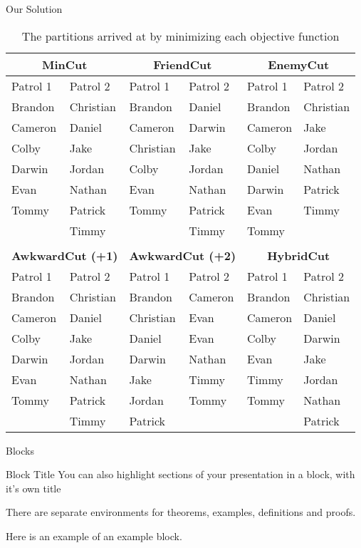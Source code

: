\documentclass{beamer}
\begin{document}
\begin{frame}{Our Solution}

\begin{table}[h]
\centering
\footnotesize
\begin{tabular}{ |l|l|l|l|l|l| }
\hline
\multicolumn{2}{|c|}{\textbf{MinCut}} & \multicolumn{2}{|c|}{\textbf{FriendCut}} & \multicolumn{2}{|c|}{\textbf{EnemyCut}}\\
\hline
Patrol 1 & Patrol 2 & Patrol 1 & Patrol 2 & Patrol 1 & Patrol 2\\
\hline
Brandon & Christian & Brandon & Daniel & Brandon & Christian\\
Cameron & Daniel & Cameron & Darwin & Cameron & Jake\\
Colby & Jake & Christian & Jake & Colby & Jordan\\
Darwin & Jordan & Colby & Jordan  & Daniel & Nathan\\
Evan & Nathan & Evan & Nathan & Darwin & Patrick\\
Tommy & Patrick & Tommy & Patrick & Evan & Timmy\\
& Timmy & & Timmy & Tommy & \\
\hline
\multicolumn{6}{|c|}{\hphantom{1}} \\
\hline
\multicolumn{2}{|c|}{\textbf{AwkwardCut (+1)}} & \multicolumn{2}{|c|}{\textbf{AwkwardCut (+2)}} & \multicolumn{2}{|c|}{\textbf{HybridCut}} \\
\hline
Patrol 1 & Patrol 2 & Patrol 1 & Patrol 2 & Patrol 1 & Patrol 2\\
\hline
Brandon & Christian & Brandon & Cameron & Brandon & Christian\\
Cameron & Daniel & Christian & Evan & Cameron & Daniel\\
Colby & Jake & Daniel & Evan & Colby & Darwin\\
Darwin & Jordan & Darwin & Nathan & Evan & Jake\\
Evan & Nathan & Jake & Timmy & Timmy & Jordan\\
Tommy & Patrick & Jordan & Tommy & Tommy & Nathan\\
\hphantom{1} & Timmy & Patrick & \hphantom{1} & \hphantom{1} & Patrick\\
\hline
\end{tabular}
\caption{The partitions arrived at by minimizing each objective function}
\end{table}

\end{frame}

\begin{frame}{Blocks}
\begin{block}{Block Title}
You can also highlight sections of your presentation in a block, with it's own title
\end{block}
\begin{theorem}
There are separate environments for theorems, examples, definitions and proofs.
\end{theorem}
\begin{example}
Here is an example of an example block.
\end{example}
\end{frame}
\end{document}
